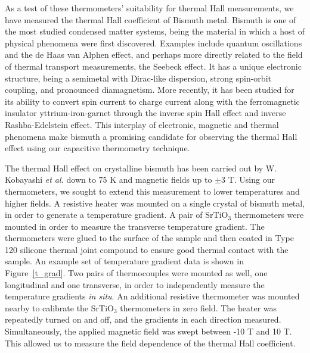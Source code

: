 \documentclass{thesis-umich}
\begin{document}
As a test of these thermometers' suitability for thermal Hall measurements, we
have measured the thermal Hall coefficient of Bismuth metal. Bismuth is one of
the most studied condensed matter systems, being the material in which a host of
physical phenomena were first discovered. Examples include quantum oscillations
and the de Haas van Alphen effect\cite{deHaas1930}, and perhaps more directly
related to the field of thermal transport measurements, the Seebeck
effect\cite{Seebeck1922}. It has a unique electronic structure, being a semimetal
with Dirac-like dispersion\cite{Lui1995, Li2008}, strong spin-orbit
coupling\cite{Yafet1963}, and pronounced diamagnetism\cite{Shoenberg1936}. More
recently, it has been studied\cite{Emoto2016} for its ability to convert spin
current to charge current along with the ferromagnetic insulator
yttrium-iron-garnet through the inverse spin Hall effect and inverse
Rashba-Edelstein effect. This interplay of electronic, magnetic and thermal
phenomena make bismuth a promising candidate for observing the thermal Hall
effect using our capacitive thermometry technique.

The thermal Hall effect on crystalline bismuth has been carried out by W.
Kobayashi \textit{et al.}\cite{Kobayashi2012} down to 75 K and magnetic fields up
to $\pm$3 T. Using our thermometers, we sought to extend this measurement to
lower temperatures and higher fields. A resistive heater was mounted on a single
crystal of bismuth metal, in order to generate a temperature gradient. A pair of
SrTiO$_3$ thermometers were mounted in order to measure the transverse
temperature gradient. The thermometers were glued to the surface of the sample
and then coated in Type 120 silicone thermal joint compound to ensure good
thermal contact with the sample. An example set of temperature gradient data is
shown in Figure~\ref{t_grad}. Two pairs of thermocouples were mounted as well,
one longitudinal and one transverse, in order to independently measure the
temperature gradients \textit{in situ}. An additional resistive thermometer was
mounted nearby to calibrate the SrTiO$_3$ thermometers in zero field.  The
heater was repeatedly turned on and off, and the gradients in each direction
measured. Simultaneously, the applied magnetic field was swept between -10 T and
10 T. This allowed us to measure the field dependence of the thermal Hall
coefficient.
\end{document}
